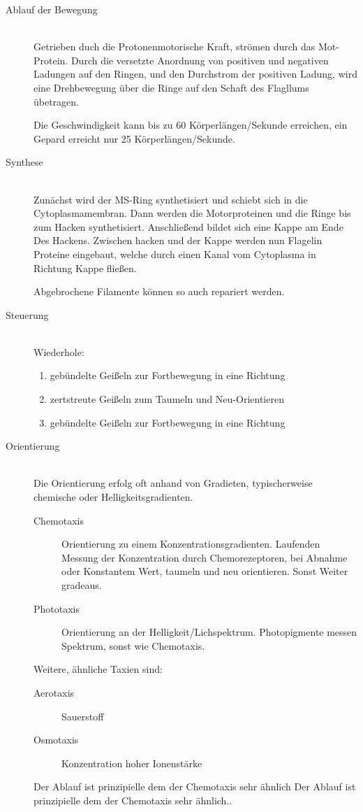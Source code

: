 \begin{description}
	\item[Ablauf der Bewegung] \hfill \\
		Getrieben duch die Protonenmotorische Kraft,
		strömen  durch das Mot-Protein.
		Durch die versetzte Anordnung von positiven und negativen Ladungen auf den Ringen,
		und den Durchstrom der positiven Ladung,
		wird eine Drehbewegung über die Ringe auf den Schaft des Flagllums übetragen.

		Die Geschwindigkeit kann bis zu 60 Körperlängen/Sekunde erreichen,
		ein Gepard erreicht nur 25 Körperlängen/Sekunde.

	\item[Synthese] \hfill \\
		Zunächst wird der MS-Ring synthetisiert und schiebt sich in die Cytoplasmamembran.
		Dann werden die Motorproteinen und die Ringe bis zum Hacken synthetisiert.
		Anschließend bildet sich eine Kappe am Ende Des Hackens.
		Zwischen hacken und der Kappe werden nun Flagelin Proteine eingebaut,
		welche durch einen Kanal vom Cytoplasma in Richtung Kappe fließen.

		Abgebrochene Filamente können so auch repariert werden.

	\item[Steuerung] \hfill \\
		Wiederhole:
		\begin{enumerate}
			\item gebündelte Geißeln zur Fortbewegung in eine Richtung
			\item zertstreute Geißeln zum Taumeln und Neu-Orientieren
			\item gebündelte Geißeln zur Fortbewegung in eine Richtung
		\end{enumerate}

	\item[Orientierung] \hfill \\
		Die Orientierung erfolg oft anhand von Gradieten,
		typischerweise chemische oder Helligkeitsgradienten.
		
		\begin{description}
			\item[Chemotaxis]	Orientierung zu einem Konzentrationsgradienten.
				Laufenden Messung der Konzentration durch Chemorezeptoren,
				bei Abnahme oder Konstantem Wert, taumeln und neu orientieren.
				Sonst Weiter gradeaus.
			\item[Phototaxis] Orientierung an der Helligkeit/Lichspektrum.
				Photopigmente messen Spektrum, sonst wie Chemotaxis.
		\end{description}
		
		Weitere, ähnliche Taxien sind: 
		\begin{description}
			\item[Aerotaxis]	Sauerstoff
			\item[Osmotaxis]	Konzentration hoher Ionenstärke
		\end{description}

		Der Ablauf ist prinzipielle dem der Chemotaxis sehr ähnlich
		Der Ablauf ist prinzipielle dem der Chemotaxis sehr ähnlich..
\end{description}

